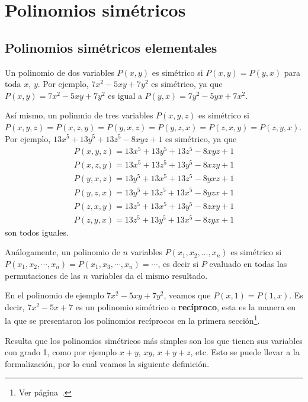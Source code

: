 \newpage
\section{Polinomios simétricos}

\subsection{Polinomios simétricos elementales}

Un polinomio de dos variables $P(x, y)$ es simétrico si $P(x, y) = P(y, x)$ para toda $x$, $y$.
Por ejemplo, $7x^2 - 5xy + 7y^2$ es simétrico, ya que $P(x, y) = 7x^2 - 5xy + 7y^2$ es igual a $P(y, x) = 7y^2 - 5yx + 7x^2$.

Así mismo, un polinmio de tres variables $P(x, y, z)$ es simétrico si $P(x, y, z) = P(x, z, y) = P(y, x, z) = P(y, z, x) = P(z, x, y) = P(z, y, x)$.
Por ejemplo, $13x^5 + 13y^5 + 13z^5 - 8xyz + 1$ es simétrico, ya que
\begin{gather*}
    P(x, y, z) = 13x^5 + 13y^5 + 13z^5 - 8xyz + 1\\
    P(x, z, y) = 13x^5 + 13z^5 + 13y^5 - 8xzy + 1\\
    P(y, x, z) = 13y^5 + 13x^5 + 13z^5 - 8yxz + 1\\
    P(y, z, x) = 13y^5 + 13z^5 + 13x^5 - 8yzx + 1\\
    P(z, x, y) = 13z^5 + 13x^5 + 13y^5 - 8zxy + 1\\
    P(z, y, x) = 13z^5 + 13y^5 + 13x^5 - 8zyx + 1
\end{gather*}
son todos iguales.

Análogamente, un polinomio de $n$ variables $P(x_1, x_2, \dots, x_n)$ es simétrico si $P(x_1, x_2, \cdots, x_n) = P(x_1, x_3, \cdots, x_n) = \cdots$, es decir si $P$ evaluado en todas las permutaciones de las $n$ variables da el mismo resultado.

\begin{remark.tcb}
    En el polinomio de ejemplo $7x^2 - 5xy + 7y^2$, veamos que $P(x, 1) =  P(1, x)$.
    Es decir, $7x^2 - 5x + 7$ es un polinomio simétrico o \textbf{recíproco}, esta es la manera en la que se presentaron los polinomios recíprocos en la primera sección\footnote{Ver página~\pageref{reci-polynomial}.}.
\end{remark.tcb}

Resulta que los polinomios simétricos más simples son los que tienen sus variables con grado 1, como por ejemplo $x + y$, $xy$, $x + y + z$, etc.
Esto se puede llevar a la formalización, por lo cual veamos la siguiente definición.

